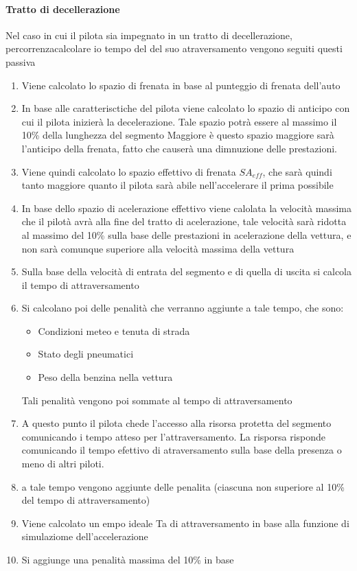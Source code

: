 \documentclass[a4paper,11pt, twoside]{book}
\begin{document}
	  \paragraph{Tratto di decellerazione}
	    Nel caso in cui il pilota sia impegnato in un tratto di decellerazione, percorrenzacalcolare io tempo del
	    del suo atraversamento vengono seguiti questi passiva
	    
	    \begin{enumerate}
	      \item Viene calcolato lo spazio di frenata in base al punteggio di frenata dell'auto
	      \item In base alle caratterisctiche del pilota viene calcolato lo spazio di anticipo con cui il
		    pilota inizierà la decelerazione. Tale spazio potrà essere al massimo il 10\% della lunghezza del segmento
		    Maggiore è questo spazio maggiore sarà l'anticipo della frenata, fatto che causerà una dimnuzione delle prestazioni.
		    
	      \item Viene quindi calcolato lo spazio effettivo di frenata $SA_{eff}$, che sarà quindi tanto maggiore quanto
		    il pilota sarà abile nell'accelerare il prima possibile
	      \item In base dello spazio di acelerazione effettivo viene calolata la velocità massima che il pilotà avrà alla fine del 
		    tratto di acelerazione,
		    tale velocità sarà ridotta al massimo del 10\% sulla base delle prestazioni in acelerazione della vettura,
		    e non sarà comunque superiore alla velocità massima della vettura
	      \item Sulla base della velocità di entrata del segmento e di quella di uscita si calcola il tempo di attraversamento
	      \item Si calcolano poi delle penalità che verranno aggiunte a tale tempo, che sono:
		    \begin{itemize}
		      \item Condizioni meteo e tenuta di strada
		      \item Stato degli pneumatici
		      \item Peso della benzina nella vettura
		    \end{itemize}
		    Tali penalità vengono poi sommate al tempo di attraversamento
	      \item A questo punto il pilota chede l'accesso alla risorsa protetta del segmento
		    comunicando i tempo atteso per l'attraversamento. La risporsa risponde comunicando il tempo
		    efettivo di atraversamento sulla base della presenza o meno di altri piloti.
	      
	      \item a tale tempo vengono aggiunte delle penalita (ciascuna non superiore al 10\% del tempo di attraversamento)
	      \item Viene calcolato un empo ideale Ta di attraversamento in base alla funzione di simulaziome dell'accelerazione
	      \item Si aggiunge una penalità massima del 10\% in base  
	    \end{enumerate}
\end{document}
